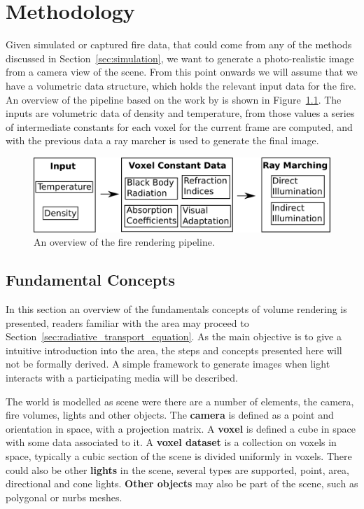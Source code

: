 \chapter{Methodology}
\label{ch:methodology}

Given simulated or captured fire data, that could come from any of the methods discussed in Section~\ref{sec:simulation}, we want to generate a photo-realistic image from a camera view of the scene.
From this point onwards we will assume that we have a volumetric data structure, which holds the relevant input data for the fire.
An overview of the pipeline based on the work by \cite{Pegoraro:2006} is shown in Figure~\ref{fig:pipeline}.
The inputs are volumetric data of density and temperature, from those values a series of intermediate constants for each voxel for the current frame are computed, and with the previous data a ray marcher is used to generate the final image.

\begin{figure}[htbp!]
	\centering
	\includegraphics[width=\textwidth]{img/pipeline}
	\caption{An overview of the fire rendering pipeline.}
	\label{fig:pipeline}
\end{figure}

\section{Fundamental Concepts}
\label{sec:fundamental_concepts}

In this section an overview of the fundamentals concepts of volume rendering is presented, readers familiar with the area may proceed to Section~\ref{sec:radiative_transport_equation}.
As the main objective is to give a intuitive introduction into the area, the steps and concepts presented here will not be formally derived.
A simple framework to generate images when light interacts with a participating media will be described. 

The world is modelled as scene were there are a number of elements, the camera, fire volumes, lights and other objects.
The \textbf{camera} is defined as a point and orientation in space, with a projection matrix.
A \textbf{voxel} is defined a cube in space with some data associated to it.
A \textbf{voxel dataset} is a collection on voxels in space, typically a cubic section of the scene is divided uniformly in voxels.
There could also be other \textbf{lights} in the scene, several types are supported, point, area, directional and cone lights.
\textbf{Other objects} may also be part of the scene, such as polygonal or nurbs meshes.

